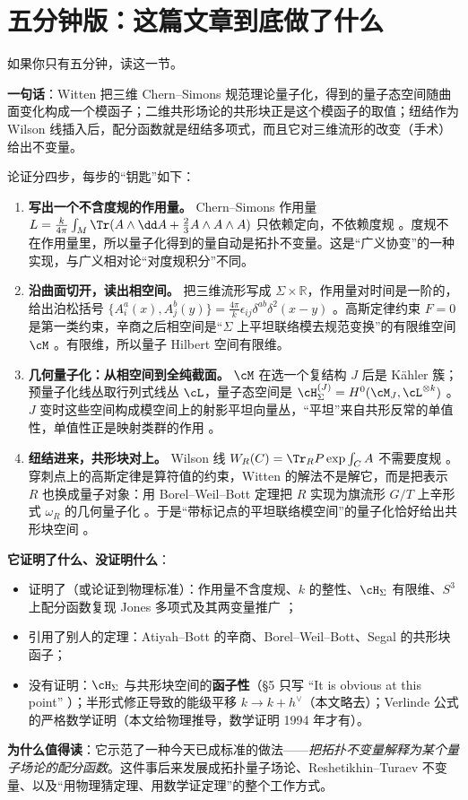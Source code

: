 \section{五分钟版：这篇文章到底做了什么}

如果你只有五分钟，读这一节。

\begin{keypoint}
\textbf{一句话}：Witten 把三维 Chern--Simons 规范理论量子化，得到的量子态空间随曲面变化构成一个模函子；二维共形场论的共形块正是这个模函子的取值；纽结作为 Wilson 线插入后，配分函数就是纽结多项式，而且它对三维流形的改变（手术）给出不变量。
\end{keypoint}

论证分四步，每步的“钥匙”如下：

\begin{enumerate}[leftmargin=2em]
\item \textbf{写出一个不含度规的作用量。}
Chern--Simons 作用量 $L=\frac{k}{4\pi}\int_M\Tr(A\wedge \dd A+\tfrac23 A\wedge A\wedge A)$ 只依赖定向，不依赖度规 。度规不在作用量里，所以量子化得到的量自动是拓扑不变量。这是“广义协变”的一种实现，与广义相对论“对度规积分”不同。

\item \textbf{沿曲面切开，读出相空间。}
把三维流形写成 $\Sigma\times\mathbb{R}$，作用量对时间是一阶的，给出泊松括号 $\{A_i^a(x),A_j^b(y)\}=\frac{4\pi}{k}\epsilon_{ij}\delta^{ab}\delta^2(x-y)$ 。高斯定律约束 $F=0$ 是第一类约束，辛商之后相空间是“$\Sigma$ 上平坦联络模去规范变换”的有限维空间 $\cM$ 。有限维，所以量子 Hilbert 空间有限维。

\item \textbf{几何量子化：从相空间到全纯截面。}
$\cM$ 在选一个复结构 $J$ 后是 K\"ahler 簇；预量子化线丛取行列式线丛 $\cL$，量子态空间是 $\cH_\Sigma^{(J)}=H^0(\cM_J,\cL^{\otimes k})$ 。$J$ 变时这些空间构成模空间上的射影平坦向量丛，“平坦”来自共形反常的单值性，单值性正是映射类群的作用 。

\item \textbf{纽结进来，共形块对上。}
Wilson 线 $W_R(C)=\Tr_R P\exp\int_C A$ 不需要度规 。穿刺点上的高斯定律是算符值的约束，Witten 的解法不是解它，而是把表示 $R$ 也换成量子对象：用 Borel--Weil--Bott 定理把 $R$ 实现为旗流形 $G/T$ 上辛形式 $\omega_R$ 的几何量子化 。于是“带标记点的平坦联络模空间”的量子化恰好给出共形块空间 。
\end{enumerate}

\textbf{它证明了什么、没证明什么}：
\begin{itemize}[leftmargin=1.6em]
\item 证明了（或论证到物理标准）：作用量不含度规、$k$ 的整性、$\cH_\Sigma$ 有限维、$S^3$ 上配分函数复现 Jones 多项式及其两变量推广 ；
\item 引用了别人的定理：Atiyah--Bott 的辛商、Borel--Weil--Bott、Segal 的共形块函子；
\item 没有证明：$\cH_\Sigma$ 与共形块空间的\textbf{函子性}（§5 只写 “It is obvious at this point” ）；半形式修正导致的能级平移 $k\to k+h^\vee$（本文略去）；Verlinde 公式的严格数学证明（本文给物理推导，数学证明 1994 年才有）。
\end{itemize}

\textbf{为什么值得读}：它示范了一种今天已成标准的做法——\emph{把拓扑不变量解释为某个量子场论的配分函数}。这件事后来发展成拓扑量子场论、Reshetikhin--Turaev 不变量、以及“用物理猜定理、用数学证定理”的整个工作方式。
